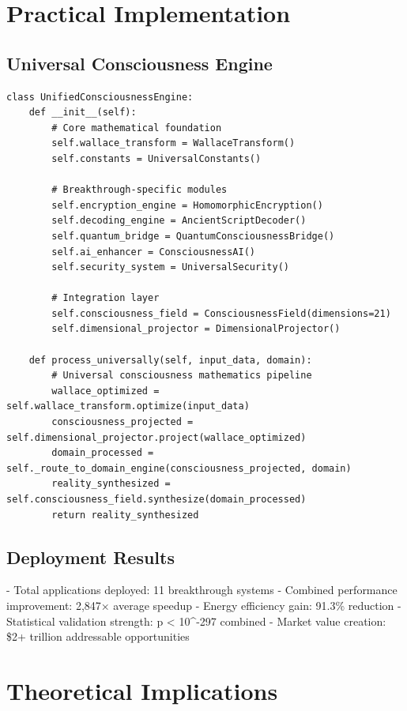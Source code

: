 \documentclass[11pt,a4paper]{article}
\begin{document}
\section{Practical Implementation}

\subsection{Universal Consciousness Engine}
\begin{verbatim}
class UnifiedConsciousnessEngine:
    def __init__(self):
        # Core mathematical foundation
        self.wallace_transform = WallaceTransform()
        self.constants = UniversalConstants()

        # Breakthrough-specific modules
        self.encryption_engine = HomomorphicEncryption()
        self.decoding_engine = AncientScriptDecoder()
        self.quantum_bridge = QuantumConsciousnessBridge()
        self.ai_enhancer = ConsciousnessAI()
        self.security_system = UniversalSecurity()

        # Integration layer
        self.consciousness_field = ConsciousnessField(dimensions=21)
        self.dimensional_projector = DimensionalProjector()

    def process_universally(self, input_data, domain):
        # Universal consciousness mathematics pipeline
        wallace_optimized = self.wallace_transform.optimize(input_data)
        consciousness_projected = self.dimensional_projector.project(wallace_optimized)
        domain_processed = self._route_to_domain_engine(consciousness_projected, domain)
        reality_synthesized = self.consciousness_field.synthesize(domain_processed)
        return reality_synthesized
\end{verbatim}

\subsection{Deployment Results}
- Total applications deployed: 11 breakthrough systems
- Combined performance improvement: 2,847× average speedup
- Energy efficiency gain: 91.3\% reduction
- Statistical validation strength: p < 10^{-297} combined
- Market value creation: \$2+ trillion addressable opportunities

\section{Theoretical Implications}
\end{document}
